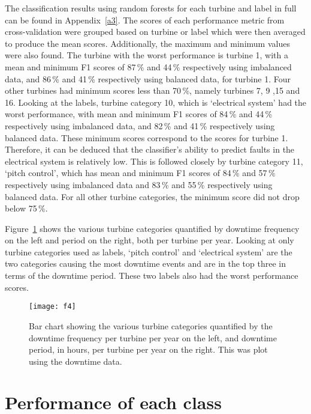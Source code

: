 The classification results using random forests for each turbine and label in full can be found in Appendix~\ref{a3}. The scores of each performance metric from cross-validation were grouped based on turbine or label which were then averaged to produce the mean scores. Additionally, the maximum and minimum values were also found. The turbine with the worst performance is turbine 1, with a mean and minimum F1 scores of 87\,\% and 44\,\% respectively using imbalanced data, and 86\,\% and 41\,\% respectively using balanced data, for turbine 1. Four other turbines had minimum scores less than 70\,\%, namely turbines 7, 9 ,15 and 16. Looking at the labels, turbine category 10, which is `electrical system' had the worst performance, with mean and minimum F1 scores of 84\,\% and 44\,\% respectively using imbalanced data, and 82\,\% and 41\,\% respectively using balanced data. These minimum scores correspond to the scores for turbine 1. Therefore, it can be deduced that the classifier's ability to predict faults in the electrical system is relatively low. This is followed closely by turbine category 11, `pitch control', which has mean and minimum F1 scores of 84\,\% and 57\,\% respectively using imbalanced data and 83\,\% and 55\,\% respectively using balanced data. For all other turbine categories, the minimum score did not drop below 75\,\%.

Figure~\ref{f4} shows the various turbine categories quantified by downtime frequency on the left and period on the right, both per turbine per year. Looking at only turbine categories used as labels, `pitch control' and `electrical system' are the two categories causing the most downtime events and are in the top three in terms of the downtime period. These two labels also had the worst performance scores.

\begin{figure}
    \centering
    \texttt{[image: f4]}
    \caption{\label{f4}Bar chart showing the various turbine categories quantified by the downtime frequency per turbine per year on the left, and downtime period, in hours, per turbine per year on the right. This was plot using the downtime data.}
\end{figure}

\section{Performance of each class}

